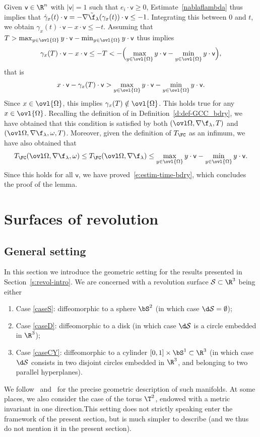 Given $\mathsf{v}\in \R^n$ with $|\mathsf{v}|=1$ such that $e_i \cdot \mathsf{v} \geq 0$, Estimate~\eqref{nablaflambda} thus implies that $\dot{\gamma}_x(t)\cdot \mathsf{v} = -\nabla\tilde{\f}_{\lambda}(\gamma_x(t))\cdot \mathsf{v}\leq -1$. Integrating this between $0$ and $t$, we obtain $\gamma_x(t)\cdot \mathsf{v}-x\cdot \mathsf{v} \leq -t.$
Assuming that $T> \max_{y \in \ovl{\Omega}} y\cdot \mathsf{v} - \min_{y \in \ovl{\Omega}} y\cdot \mathsf{v}$ thus implies
\[
\gamma_x(T)\cdot \mathsf{v}-x\cdot \mathsf{v} \leq -T < - \Bigl(\max_{y \in \ovl{\Omega}} y\cdot \mathsf{v} - \min_{y \in \ovl{\Omega}} y\cdot \mathsf{v} \Bigr),
\]
that is
\[
x\cdot \mathsf{v}-\gamma_x(T)\cdot \mathsf{v} > \max_{y \in \ovl{\Omega}} y\cdot \mathsf{v} - \min_{y \in \ovl{\Omega}} y\cdot \mathsf{v}.
\]
Since $x \in \ovl{\Omega}$, this implies $\gamma_x(T) \notin \ovl{\Omega}$. This holds true for any $x \in \ovl{\Omega}$.
Recalling the definition of \pFC in Definition~\ref{d:def-GCC_bdry}, we have obtained that this condition is satisfied by both $(\ovl\Omega,\nabla \f_\lambda,T)$ and $(\ovl\Omega,\nabla \f_\lambda,\omega,T)$. Moreover, given the definition of $T_{\FC}$ as an infimum, we have also obtained that
\[
T_{\FC}(\ovl\Omega,\nabla \f_\lambda,\omega) \leq T_{\FC}(\ovl\Omega,\nabla \f_\lambda)\leq \max_{y \in \ovl{\Omega}} y\cdot \mathsf{v} - \min_{y \in \ovl{\Omega}} y\cdot \mathsf{v}.
\]
Since this holds for all $\mathsf{v}$, we have proved~\eqref{e:estim-time-bdry}, which concludes the proof of the lemma.
\enp

\section{Surfaces of revolution}
\label{s:revolution}
\subsection{General setting}
\label{s:revol}
In this section we introduce the geometric setting for the results presented in Section~\ref{s:revol-intro}. We are concerned with a revolution surface $\mathcal{S}\subset \R^3$ being either
\begin{enumerate}
\item \label{caseS}Case \ref{caseS}: diffeomorphic to a sphere $\bS^2$ (in which case $\d\mathcal{S} = \emptyset$);
\item \label{caseD}Case \ref{caseD}: diffeomorphic to a disk (in which case $\d\mathcal{S}$ is a circle embedded in $\R^3$);
\item \label{caseCY}Case \ref{caseCY}: diffeomorphic to a cylinder $[0,1] \times \bS^1 \subset \R^3$ (in which case $\d\mathcal{S}$ consists in two disjoint circles embedded in $\R^3$, and belonging to two parallel hyperplanes).
\end{enumerate}
We follow~\cite{LL:18} and~\cite[Chap.\,4B p95]{Besse} for the precise geometric description of such manifolds.
At some places, we also consider the case of the torus $\T^2$, endowed with a metric invariant in one direction.This setting does not strictly speaking enter the framework of the present section, but is much simpler to describe (and we thus do not mention it in the present section).

